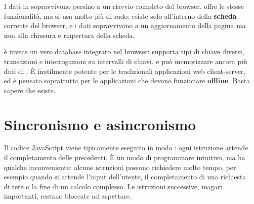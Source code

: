 I dati in  sopravvivono persino a un riavvio completo del
browser.  offre le stesse funzionalità, ma si usa molto più
di rado: esiste solo all'interno della \textbf{scheda} corrente del browser, e i
dati sopravvivono a un aggiornamento della pagina ma non alla chiusura e
riapertura della scheda.

 è invece un vero database integrato nel browser: supporta tipi
di chiave diversi, transazioni e interrogazioni su intervalli di chiavi, e può
memorizzare ancora più dati di . È inutilmente potente per le
tradizionali applicazioni web client-server, ed è pensato soprattutto per le
applicazioni che devono funzionare \textbf{offline}. Basta sapere che esiste.


\section{Sincronismo e asincronismo}

Il codice JavaScript viene tipicamente eseguito in modo : ogni
istruzione attende il completamento delle precedenti. È un modo di programmare
intuitivo, ma ha qualche inconveniente: alcune istruzioni possono richiedere
molto tempo, per esempio quando si attende l'input dell'utente, il
completamento di una richiesta di rete o la fine di un calcolo complesso. Le
istruzioni successive, magari importanti, restano bloccate ad aspettare.


